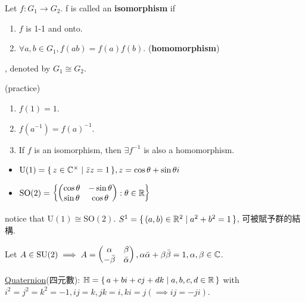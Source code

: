 \begin{definition}
  Let $f: G_1 \to G_2$. f is called an {\bf isomorphism} if
  \begin{enumerate}
    \item $f$ is 1-1 and onto.
    \item $\forall a, b \in G_1, f(ab) = f(a)f(b)$. ({\bf homomorphism})
  \end{enumerate}
  , denoted by $G_1 \cong G_2$.
\end{definition}

\begin{remark} (practice)
  \begin{enumerate}
    \item $f(1) = 1$.
    \item $f(a^{-1}) = f(a)^{-1}$.
    \item If $f$ is an isomorphism, then $\exists f^{-1}$ is also a
      homomorphism.
  \end{enumerate}
\end{remark}

\begin{example} \mbox{}
  \begin{itemize}
    \item $\text{U}(1) = \{\, z \in \mathbb{C}^\times \mid \bar{z}z = 1 \,\},
      z = \cos \theta + \sin \theta i$
    \item $\text{SO}(2) = \left\{ \begin{pmatrix}
        \cos \theta & - \sin\theta \\
        \sin \theta & \cos\theta
      \end{pmatrix} : \theta \in \mathbb{R} \right\}$
  \end{itemize}
  notice that $\text{U}(1) \cong \text{SO}(2)$.
  $S^1 = \{\, (a, b) \in \mathbb{R}^2 \mid a^2 + b^2 = 1 \,\}$, 可被賦予群的結構.
\end{example}

\begin{example}
  Let $A \in \text{SU}(2) \implies A = \begin{pmatrix}
    \alpha & \beta \\
    -\bar{\beta} & \bar{\alpha} \end{pmatrix},
    \alpha\bar{\alpha} + \beta\bar{\beta} = 1, \alpha, \beta \in \mathbb{C}$.
\end{example}

\underline{Quaternion}(四元數): $\mathbb{H} = \{\,
  a + bi + cj + dk \mid a, b, c, d \in \mathbb{R} \,\}$ with $i^2 = j^2 = k^2 = -1,
  ij = k, jk = i, ki = j (\implies ij = -ji)$.

